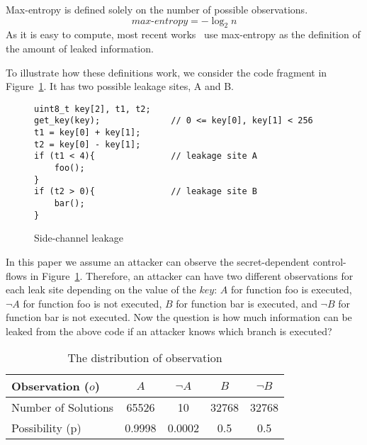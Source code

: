 Max-entropy is defined solely on the number of possible observations.
\begin{displaymath}
    \mathit{max\text{-}entropy} = -\log_2{n}
\end{displaymath}
As it is easy to compute, most recent works~\cite{182946,Doychev:2017:RAS:3062341.3062388} use max-entropy as the definition of
the amount of leaked information.

To illustrate how these definitions work, we consider the code
fragment in Figure~\ref{fig:side-channel}. It has two possible leakage sites, A and B.

\begin{figure}[h!]
\centering
\begin{lstlisting}[xleftmargin=.03\textwidth,xrightmargin=.01\textwidth]
uint8_t key[2], t1, t2;
get_key(key);              // 0 <= key[0], key[1] < 256
t1 = key[0] + key[1];
t2 = key[0] - key[1];
if (t1 < 4){               // leakage site A
    foo();    
}                          
if (t2 > 0){               // leakage site B     
    bar();    
}                          
\end{lstlisting}
\vspace*{-1pt}
    \caption{Side-channel leakage}
    \label{fig:side-channel}
\end{figure}
In this paper we assume an attacker can observe the secret-dependent control-flows in Figure~\ref{fig:side-channel}.
Therefore, an attacker can have two different observations for each leak site
depending on the value of the $\mathit{key}$: $A$ for function \textsf{foo} is executed, 
$\neg A$ for function \textsf{foo} is not executed, $B$ for function \textsf{bar} is
executed, and $\neg B$ for function \textsf{bar} is not executed. Now the
question is how much information can be leaked from the above code if an
attacker knows which branch is executed?

\begin{table}[ht]
    \centering\small\footnotesize
    \caption{The distribution of observation}\label{shtable}
    \vspace*{-0pt}
    \begin{tabular}{l|cc|cc}
        \hline
        Observation ($o$)   & $A$ & $\neg A$ & $B$ & $\neg B$ \\ \hline
        Number of Solutions & 65526       & 10        & 32768     & 32768           \\ \hline
        Possibility (p)     & 0.9998      & 0.0002    & 0.5    & 0.5       \\
        \hline
    \end{tabular}
\end{table}

